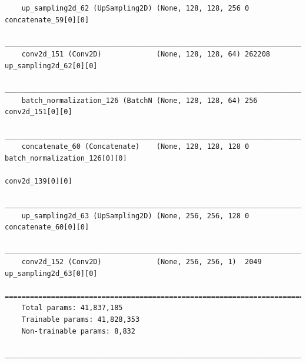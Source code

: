{\begin{verbatim}
    up_sampling2d_62 (UpSampling2D) (None, 128, 128, 256 0           concatenate_59[0][0]             
    __________________________________________________________________________________________________
    conv2d_151 (Conv2D)             (None, 128, 128, 64) 262208      up_sampling2d_62[0][0]           
    __________________________________________________________________________________________________
    batch_normalization_126 (BatchN (None, 128, 128, 64) 256         conv2d_151[0][0]                 
    __________________________________________________________________________________________________
    concatenate_60 (Concatenate)    (None, 128, 128, 128 0           batch_normalization_126[0][0]    
                                                                        conv2d_139[0][0]                 
    __________________________________________________________________________________________________
    up_sampling2d_63 (UpSampling2D) (None, 256, 256, 128 0           concatenate_60[0][0]             
    __________________________________________________________________________________________________
    conv2d_152 (Conv2D)             (None, 256, 256, 1)  2049        up_sampling2d_63[0][0]           
    ==================================================================================================
    Total params: 41,837,185
    Trainable params: 41,828,353
    Non-trainable params: 8,832
    __________________________________________________________________________________________________
                                \end{verbatim}}
